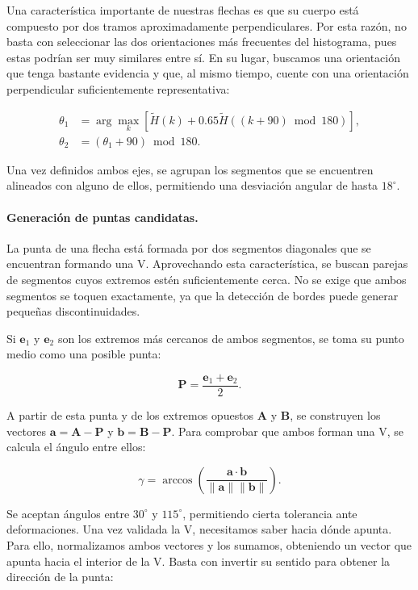 \documentclass[11pt,a4paper]{article}
\begin{document}
Una característica importante de nuestras flechas es que su cuerpo está compuesto por dos tramos aproximadamente perpendiculares. Por esta razón, no basta con seleccionar las dos orientaciones más frecuentes del histograma, pues estas podrían ser muy similares entre sí. En su lugar, buscamos una orientación que tenga bastante evidencia y que, al mismo tiempo, cuente con una orientación perpendicular suficientemente representativa:

\begin{align}
    \theta_1&=\arg\max_k
    \left[
    \widetilde H(k)+
    0.65\widetilde H((k+90)\bmod180)
    \right],\\
    \theta_2&=(\theta_1+90)\bmod180.
\end{align}

Una vez definidos ambos ejes, se agrupan los segmentos que se encuentren alineados con alguno de ellos, permitiendo una desviación angular de hasta $18^\circ$.


\paragraph{Generación de puntas candidatas.}

La punta de una flecha está formada por dos segmentos diagonales que se encuentran formando una V. Aprovechando esta característica, se buscan parejas de segmentos cuyos extremos estén suficientemente cerca. No se exige que ambos segmentos se toquen exactamente, ya que la detección de bordes puede generar pequeñas discontinuidades.

Si $\mathbf e_1$ y $\mathbf e_2$ son los extremos más cercanos de ambos segmentos, se toma su punto medio como una posible punta:

\begin{equation}
    \mathbf P=\frac{\mathbf e_1+\mathbf e_2}{2}.
\end{equation}

A partir de esta punta y de los extremos opuestos $\mathbf A$ y $\mathbf B$, se construyen los vectores $\mathbf a=\mathbf A-\mathbf P$ y $\mathbf b=\mathbf B-\mathbf P$. Para comprobar que ambos forman una V, se calcula el ángulo entre ellos:

\begin{equation}
    \gamma=
    \arccos
    \left(
    \frac{\mathbf a\cdot\mathbf b}
    {\|\mathbf a\|\|\mathbf b\|}
    \right).
\end{equation}

Se aceptan ángulos entre $30^\circ$ y $115^\circ$, permitiendo cierta tolerancia ante deformaciones. Una vez validada la V, necesitamos saber hacia dónde apunta. Para ello, normalizamos ambos vectores y los sumamos, obteniendo un vector que apunta hacia el interior de la V. Basta con invertir su sentido para obtener la dirección de la punta:
\end{document}
